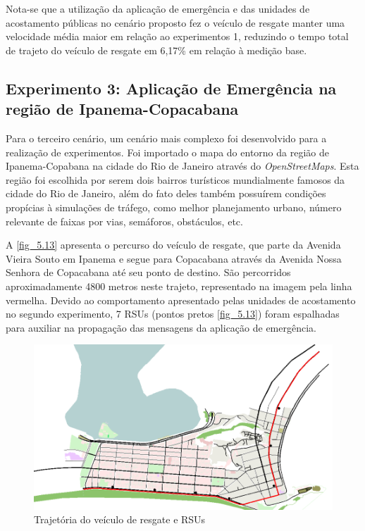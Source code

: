 \documentclass[
12pt,				%
openright,			%
oneside,			%
a4paper,			%
brazil,				%
]{abntex2}
\begin{document}
	\par Nota-se que a utilização da aplicação de emergência e das unidades de acostamento públicas no cenário proposto fez o veículo de resgate manter uma velocidade média maior em relação ao experimentos 1, reduzindo o tempo total de trajeto do veículo de resgate em 6,17\% em relação à medição base.
	
	
	\subsection{Experimento 3: Aplicação de Emergência na região de Ipanema-Copacabana}
	
	\par Para o terceiro cenário, um cenário mais complexo foi desenvolvido para a realização de experimentos. Foi importado o mapa do entorno da região de Ipanema-Copabana na cidade do Rio de Janeiro através do \textit{OpenStreetMaps}. Esta região foi escolhida por serem dois bairros turísticos mundialmente famosos da cidade do Rio de Janeiro,  além do fato deles também possuírem condições propícias à simulações de tráfego, como melhor planejamento urbano, número relevante de faixas por vias, semáforos, obstáculos, etc.
	
	\par A \autoref{fig_5.13} apresenta o percurso do veículo de resgate, que parte da Avenida Vieira Souto em Ipanema e segue para Copacabana através da Avenida Nossa Senhora de Copacabana até seu ponto de destino. São percorridos aproximadamente 4800 metros neste trajeto, representado na imagem pela linha vermelha. Devido ao comportamento apresentado pelas unidades de acostamento no segundo experimento, 7 RSUs (pontos pretos \autoref{fig_5.13}) foram espalhadas para auxiliar na propagação das mensagens da aplicação de emergência. 
	
	\begin{figure}[H]
		\centering
		\includegraphics[scale=.5]{figuras/cap5/513Cenario3}
		\caption{\label{fig_5.13}Trajetória do veículo de resgate e RSUs}
	\end{figure}	
	
\end{document}
